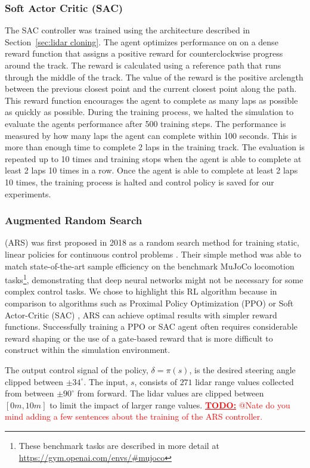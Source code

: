 \documentclass[manuscript,screen,review]{acmart}
\newcommand{\todo}[1]{\textcolor{red}{\textbf{\underline{TODO:}} #1}}
\begin{document}
\subsubsection{Soft Actor Critic (SAC)}
The SAC controller was trained
using the architecture described in Section~\ref{sec:lidar cloning}. The agent optimizes performance on on a dense reward function that assigns a positive reward for counterclockwise progress around the track. The reward is calculated using a reference path that runs through the middle of the track. The value of the reward is the positive arclength between the previous closest point and the current closest point along the path. This reward function encourages the agent to complete as many laps as possible as quickly as possible. During the training process, we halted the simulation to evaluate the agents performance after 500 training steps. The performance is measured by how many laps the agent can complete within 100 seconds. This is more than enough time to complete 2 laps in the training track. The evaluation is repeated up to 10 times and training stops when the agent is able to complete at least 2 laps 10 times in a row. Once the agent is able to complete at least 2 laps 10 times, the training process is halted and control policy is saved for our experiments.

\subsubsection{Augmented Random Search} 
(ARS) was first proposed in 2018 as a random search method for training static, linear policies for continuous control problems \cite{mania2018simple}. Their simple method was able to match state-of-the-art sample efficiency on the benchmark MuJoCo locomotion tasks\footnote{These benchmark tasks are described in more detail at \url{https://gym.openai.com/envs/\#mujoco}}, demonstrating that deep neural networks might not be necessary for some complex control tasks. We chose to highlight this RL algorithm because in comparison to algorithms such as Proximal Policy Optimization (PPO) \cite{schulman2017proximal} or Soft Actor-Critic (SAC) \cite{haarnoja2018soft}, ARS can achieve optimal results with simpler reward functions. Successfully training a PPO or SAC agent often requires considerable reward shaping or the use of a gate-based reward that is more difficult to construct within the simulation environment.

The output control signal of the policy, $\delta = \pi(s)$, is the desired steering angle clipped between $\pm 34^{\circ}$. The input, $s$, consists of $271$ lidar range values collected from between $\pm90^{\circ}$ from forward. The lidar values are clipped between $[0m, 10m]$ to limit the impact of larger range values. \todo{@Nate do you mind adding a few sentences about the training of the ARS controller.}
\end{document}
